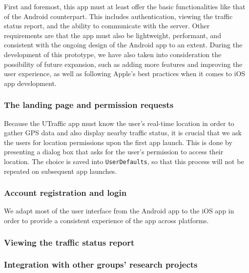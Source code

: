 First and foremost, this app must at least offer the basic functionalities like that of the Android counterpart. This includes authentication, viewing the traffic status report, and the ability to communicate with the server. Other requirements are that the app must also be lightweight, performant, and consistent with the ongoing design of the Android app to an extent. During the development of this prototype, we have also taken into consideration the possibility of future expansion, such as adding more features and improving the user experience, as well as following Apple's best practices when it comes to iOS app development.

\subsubsection{The landing page and permission requests}
Because the UTraffic app must know the user's real-time location in order to gather GPS data and also display nearby traffic status, it is crucial that we ask the users for location permissions upon the first app launch. This is done by presenting a dialog box that asks for the user's permission to access their location. The choice is saved into \lstinline{UserDefaults}, so that this process will not be repeated on subsequent app launches.

\subsubsection{Account registration and login}
We adapt most of the user interface from the Android app to the iOS app in order to provide a consistent experience of the app across platforms. 

\subsubsection{Viewing the traffic status report}

\subsubsection{Integration with other groups' research projects}



